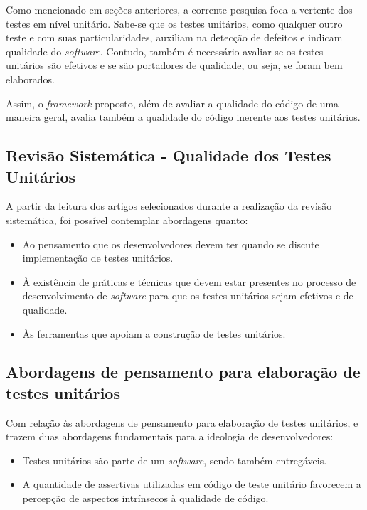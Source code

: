 Como mencionado em seções anteriores, a corrente pesquisa foca a vertente dos testes em nível unitário. Sabe-se que os testes unitários, como qualquer outro teste e com suas particularidades, auxiliam na detecção de defeitos e indicam qualidade do \textit{software}. Contudo, também é necessário avaliar se os testes unitários são efetivos e se são portadores de qualidade, ou seja, se foram bem elaborados.

Assim, o \textit{framework} proposto, além de avaliar a qualidade do código de uma maneira geral, avalia também a qualidade do código inerente aos testes unitários.

\subsection{Revisão Sistemática - Qualidade dos Testes Unitários}

A partir da leitura dos artigos selecionados durante a realização da revisão sistemática, foi possível contemplar abordagens quanto:

\begin{itemize}
	\item Ao pensamento que os desenvolvedores devem ter quando se discute implementação de testes unitários.
	\item À existência de práticas e técnicas que devem estar presentes no processo de desenvolvimento de \textit{software} para que os testes unitários sejam efetivos e de qualidade.
	\item Às ferramentas que apoiam a construção de testes unitários.
\end{itemize}

\subsection{Abordagens de pensamento para elaboração de testes unitários}

Com relação às abordagens de pensamento para elaboração de testes unitários, \cite{nasa} e \cite{asserts} trazem duas abordagens fundamentais para a ideologia de desenvolvedores:

\begin{itemize}
	\item {Testes unitários são parte de um \textit{software}, sendo também entregáveis.}
	\item {A quantidade de assertivas utilizadas em código de teste unitário favorecem a percepção de aspectos intrínsecos à qualidade de código.}
\end{itemize}

